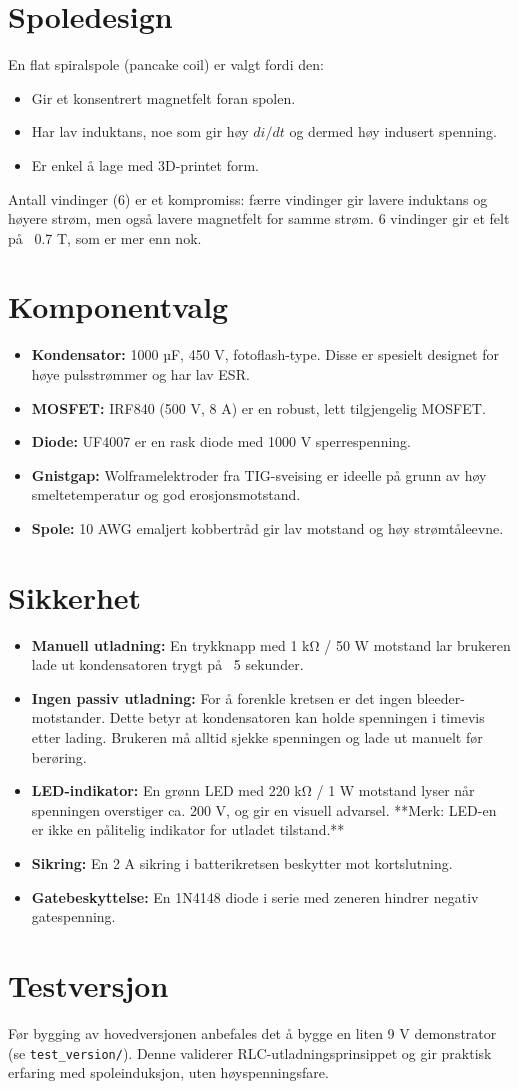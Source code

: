 \documentclass{article}
\begin{document}
\section{Spoledesign}
En flat spiralspole (pancake coil) er valgt fordi den:
\begin{itemize}
\item Gir et konsentrert magnetfelt foran spolen.
\item Har lav induktans, noe som gir høy $di/dt$ og dermed høy indusert spenning.
\item Er enkel å lage med 3D-printet form.
\end{itemize}
Antall vindinger (6) er et kompromiss: færre vindinger gir lavere induktans og høyere strøm, men også lavere magnetfelt for samme strøm. 6 vindinger gir et felt på ~0.7 T, som er mer enn nok.

\section{Komponentvalg}
\begin{itemize}
\item \textbf{Kondensator:} 1000 µF, 450 V, fotoflash-type. Disse er spesielt designet for høye pulsstrømmer og har lav ESR.
\item \textbf{MOSFET:} IRF840 (500 V, 8 A) er en robust, lett tilgjengelig MOSFET.
\item \textbf{Diode:} UF4007 er en rask diode med 1000 V sperrespenning.
\item \textbf{Gnistgap:} Wolframelektroder fra TIG-sveising er ideelle på grunn av høy smeltetemperatur og god erosjonsmotstand.
\item \textbf{Spole:} 10 AWG emaljert kobbertråd gir lav motstand og høy strømtåleevne.
\end{itemize}

\section{Sikkerhet}
\begin{itemize}
\item \textbf{Manuell utladning:} En trykknapp med 1 kΩ / 50 W motstand lar brukeren lade ut kondensatoren trygt på ~5 sekunder.
\item \textbf{Ingen passiv utladning:} For å forenkle kretsen er det ingen bleeder-motstander. Dette betyr at kondensatoren kan holde spenningen i timevis etter lading. Brukeren må alltid sjekke spenningen og lade ut manuelt før berøring.
\item \textbf{LED-indikator:} En grønn LED med 220 kΩ / 1 W motstand lyser når spenningen overstiger ca. 200 V, og gir en visuell advarsel. **Merk: LED-en er ikke en pålitelig indikator for utladet tilstand.**
\item \textbf{Sikring:} En 2 A sikring i batterikretsen beskytter mot kortslutning.
\item \textbf{Gatebeskyttelse:} En 1N4148 diode i serie med zeneren hindrer negativ gatespenning.
\end{itemize}

\section{Testversjon}
Før bygging av hovedversjonen anbefales det å bygge en liten 9 V demonstrator (se \texttt{test\_version/}). Denne validerer RLC-utladningsprinsippet og gir praktisk erfaring med spoleinduksjon, uten høyspenningsfare.
\end{document}
